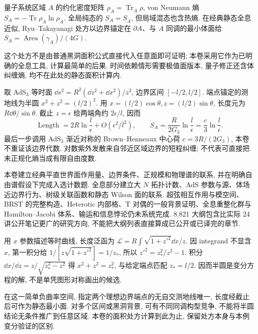 \label{ch:entanglement}
量子系统区域 $A$ 的约化密度矩阵 $\rho_A=\operatorname{Tr}_{\bar A}\rho$, von Neumann 熵 $S_A=-\operatorname{Tr}\rho_A\ln\rho_A$. 全局纯态的 $S_A=S_{\bar A}$, 但局域混态也含热熵. 在经典静态全息近似, Ryu--Takayanagi 处方以边界锚定在 $\partial A$、与 $A$ 同调的最小体面给 $S_A=\operatorname{Area}(\gamma_A)/(4G)$.

这个处方不是由普通黑洞面积公式直接代入任意面即可证明; 本卷采用它作为已明确的全息工具, 计算最简单的后果. 时间依赖情形需要极值面版本, 量子修正还含体纠缠熵, 均不在此处的静态面积计算内.

取 AdS$_3$ 等时面 $\dd s^2=R^2(\dd z^2+\dd x^2)/z^2$, 边界区间 $[-l/2,l/2]$. 端点锚定的测地线为半圆 $x^2+z^2=(l/2)^2$. 用 $x=(l/2)\cos\theta,z=(l/2)\sin\theta$, 长度元为 $R\dd\theta/\sin\theta$. 截止 $z=\epsilon$ 给两端角约 $2\epsilon/l$, 因而
\begin{equation}
\operatorname{Length}=2R\ln\frac l\epsilon+O(\epsilon^2/l^2),\qquad
S_A=\frac R{2G_3}\ln\frac l\epsilon=\frac c3\ln\frac l\epsilon.
\end{equation}
最后一步调用 AdS$_3$ 渐近对称的 Brown--Henneaux 中心荷 $c=3R/(2G_3)$, 本卷不重证该边界代数. 对数紫外发散来自邻近区域边界的短程纠缠; 不代表可直接把未正规化熵当成有限自由度数.

\begin{center}\end{center}

本卷建立经典平直世界面作用量、边界条件、正规模和物理谱的联系, 并在明确自由谱假设下完成入选计数题. 全息部分建立大 $N$ 拓扑计数、AdS 参数与源、体场近边界行为、树级关联函数和静态 Wilson 面的联系. 超弦相互作用与模空间、BRST 的完整构造、Heterotic 内部格、T 对偶的一般背景证明、全息重整化群与 Hamilton--Jacobi 体系、输运和信息悖论仍未系统完成. 8.821 大纲包含比实际 24 讲公开笔记更广的研究方向, 不能把大纲列表直接算成已公开或已译完的章节.

用 $x$ 参数描述等时曲线, 长度泛函为 $\mathcal L=R\int\sqrt{1+z'^2}\dd x/z$. 因 integrand 不显含 $x$, 第一积分给 $1/[z\sqrt{1+z'^2}]=1/z_*$, 所以 $z'^2=z_*^2/z^2-1$. 积分 $\dd x/\dd z=z/\sqrt{z_*^2-z^2}$ 得 $x^2+z^2=z_*^2$, 与给定端点匹配 $z_*=l/2$. 因而半圆是变分方程的解, 不是单凭图形对称画出的候选.

在这一简单负曲率空间, 指定两个理想边界端点的无自交测地线唯一, 长度经截止后可作为静态最小面. 对多个区间或黑洞背景, 可有不同同调构型竞争, 不能将半圆结论无条件推广到任意区域. 本卷的面积处方计算到此为止, 保留处方本身与本例变分验证的区别.

